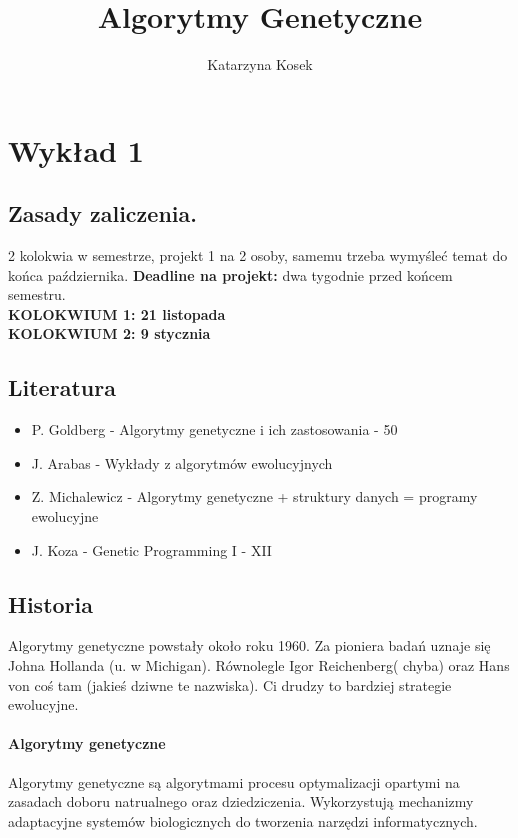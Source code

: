 \documentclass{article}
\title{Algorytmy Genetyczne}
\author{Katarzyna Kosek}
\begin{document}
	\maketitle
	\newpage
	\section{Wykład 1}
		\subsection{Zasady zaliczenia.}
		2 kolokwia w semestrze, projekt 1 na 2 osoby, samemu trzeba wymyśleć temat do końca października. \textbf{Deadline na projekt:} dwa tygodnie przed końcem semestru.
		\\
						\textbf{KOLOKWIUM 1: 21 listopada} \\
						\textbf{KOLOKWIUM 2: 9 stycznia} 
		\subsection{Literatura}
		\begin{itemize}
			\item P. Goldberg - Algorytmy genetyczne i ich zastosowania - 50%
			\item	J. Arabas - Wykłady z algorytmów ewolucyjnych
			\item	Z. Michalewicz - Algorytmy genetyczne + struktury danych = programy ewolucyjne
			\item	J. Koza - Genetic Programming I - XII
		\end{itemize}
		\subsection{Historia}
		Algorytmy genetyczne powstały około roku 1960. Za pioniera badań uznaje się Johna Hollanda (u. w Michigan). Równolegle Igor Reichenberg( chyba) oraz Hans von coś tam (jakieś dziwne te nazwiska). Ci drudzy to bardziej strategie ewolucyjne.
		\paragraph{Algorytmy genetyczne}
		Algorytmy genetyczne są algorytmami procesu optymalizacji opartymi na zasadach doboru natrualnego oraz dziedziczenia. Wykorzystują mechanizmy adaptacyjne systemów biologicznych do tworzenia narzędzi informatycznych. 
\end{document}
